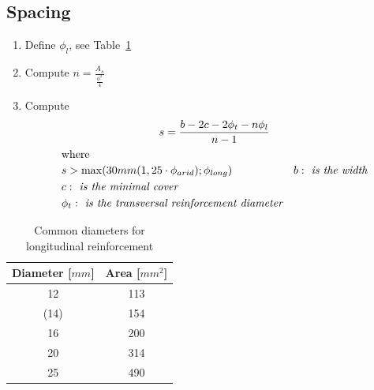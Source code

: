 \documentclass[landscape]{article}
\begin{document}
\begin{multicols*}{2}
\subsection{Spacing} %
\label{sub:spacing}
\begin{enumerate}
  \item Define $\phi_l$, see Table~\ref{tab:diam_long}
  \item Compute $n = \frac{A_s}{\frac{\phi^2}{4}}$
  \item Compute
    \begin{gather}\label{eq:2.1}
      s = \frac{b - 2c - 2\phi_t - n\phi_l}{n-1} \\
      \shortintertext{where}
      \begin{aligned}
        &s > \max(30mm (1,25 \cdot \phi_{arid}); \phi_{long})
        &b: \emph{ is the width} \\
        &c: \emph{ is the minimal cover} \\
        &\phi_t: \emph{ is the transversal reinforcement diameter}
      \end{aligned}\notag
    \end{gather}
\end{enumerate}

\begin{table}[H]
\centering
  \begin{tabular}{cc}
  \toprule
  Diameter [$mm$]& Area [$mm^2$] \\
  \midrule
  12 & 113 \\
  (14) & 154 \\
  16 & 200 \\
  20 & 314 \\
  25 & 490 \\
  \bottomrule
  \end{tabular}
  \caption{Common diameters for longitudinal reinforcement}
  \label{tab:diam_long}
\end{table}


\end{multicols*}
\end{document}
